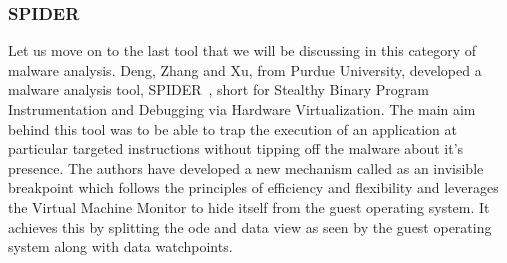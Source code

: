 \documentclass[11pt]{article}
\begin{document}
	
	\subsubsection{SPIDER}
	Let us move on to the last tool that we will be discussing in this category of malware analysis. Deng, Zhang and Xu, from Purdue University, developed a malware analysis tool, SPIDER~\cite{dongyan2013spider}, short for Stealthy Binary Program Instrumentation and Debugging via Hardware Virtualization. The main aim behind this tool was to be able to trap the execution of an application at particular targeted instructions without tipping off the malware about it’s presence. The authors have developed a new mechanism called as an invisible breakpoint which follows the principles of efficiency and flexibility and leverages the Virtual Machine Monitor to hide itself from the guest operating system. It achieves this by splitting the ode and data view as seen by the guest operating system along with data watchpoints.\\ \\
\end{document}
